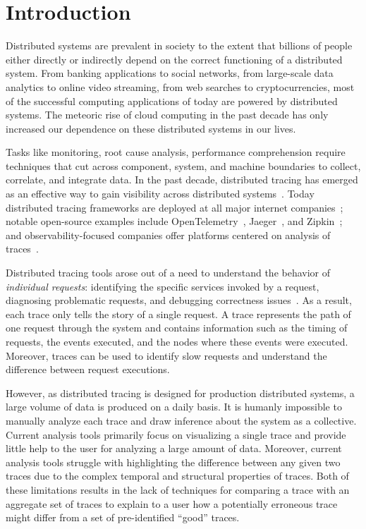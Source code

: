 \section{Introduction}
\label{sec:intro}

Distributed systems are prevalent in society to the extent that billions of people either directly or 
indirectly depend on the correct functioning of a distributed system. From banking applications to social
networks, from large-scale data analytics to online video streaming, from web searches to cryptocurrencies,
most of the successful computing applications of today are powered by distributed systems.
The meteoric rise of cloud computing in the past decade has only increased our dependence on these
distributed systems in our lives.

Tasks like monitoring, root cause analysis, performance comprehension require techniques that cut across component,
system, and machine boundaries to collect, correlate, and integrate data. In the past decade, distributed tracing has emerged as an effective way to gain visibility across distributed systems~\cite{mace2015pivot,mace2018universal,fonseca2007xtrace}.  
Today distributed tracing frameworks are deployed at all major internet companies~\cite{kaldor2017canopy,sigelman2010dapper,netflixtracing}; 
notable open-source examples include OpenTelemetry~\cite{opentelemetry}, Jaeger~\cite{jaeger}, and Zipkin~\cite{zipkin}; and 
observability-focused companies offer platforms centered on analysis of traces~\cite{lightstep}.

Distributed tracing tools arose out of a need to understand the behavior of \emph{individual requests}: identifying the specific services 
invoked by a request, diagnosing problematic requests, and debugging correctness issues~\cite{fonseca2007xtrace,sigelman2010dapper,macewe}.
As a result, each trace only tells the story of a single request.
A trace represents the path of one request through the system and contains information such as the timing of requests, 
the events executed, and the nodes where these events were executed. Moreover, traces can be used
to identify slow requests and understand the difference between request executions. 

However, as distributed tracing is designed for production distributed systems, a large volume of data
is produced on a daily basis. It is humanly impossible to manually analyze each trace and draw inference
about the system as a collective. Current analysis tools primarily focus on visualizing a single trace
and provide little help to the user for analyzing a large amount of data. Moreover, current analysis
tools struggle with highlighting the difference between any given two traces due to the complex temporal
and structural properties of traces. Both of these limitations results in the lack of techniques for
comparing a trace with an aggregate set of traces to explain to a user how a potentially erroneous trace
might differ from a set of pre-identified ``good'' traces.

